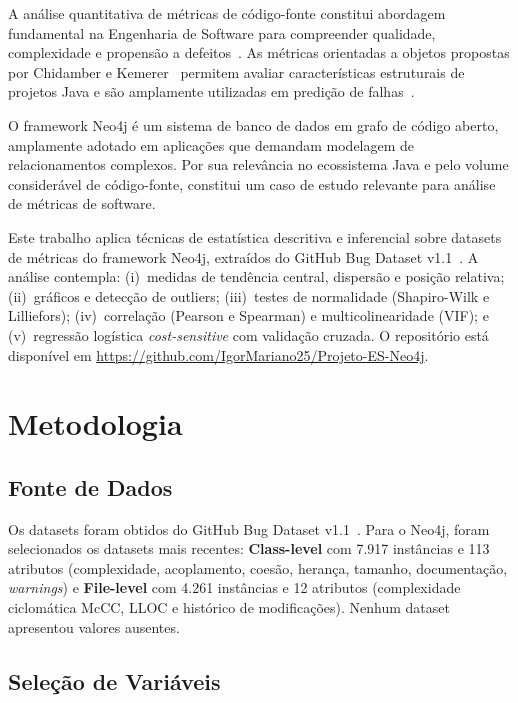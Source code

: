 \documentclass[conference]{IEEEtran}
\begin{document}
A análise quantitativa de métricas de código-fonte constitui abordagem fundamental na Engenharia de Software para compreender qualidade, complexidade e propensão a defeitos~\cite{pressman2014}. As métricas orientadas a objetos propostas por Chidamber e Kemerer~\cite{chidamber1994} permitem avaliar características estruturais de projetos Java e são amplamente utilizadas em predição de falhas~\cite{gyimothy2005,basili1996}.

O framework Neo4j é um sistema de banco de dados em grafo de código aberto, amplamente adotado em aplicações que demandam modelagem de relacionamentos complexos. Por sua relevância no ecossistema Java e pelo volume considerável de código-fonte, constitui um caso de estudo relevante para análise de métricas de software.

Este trabalho aplica técnicas de estatística descritiva e inferencial sobre datasets de métricas do framework Neo4j, extraídos do GitHub Bug Dataset v1.1~\cite{toth2016}. A análise contempla: (i)~medidas de tendência central, dispersão e posição relativa; (ii)~gráficos e detecção de outliers; (iii)~testes de normalidade (Shapiro-Wilk e Lilliefors); (iv)~correlação (Pearson e Spearman) e multicolinearidade (VIF); e (v)~regressão logística \textit{cost-sensitive} com validação cruzada. O repositório está disponível em \url{https://github.com/IgorMariano25/Projeto-ES-Neo4j}.

\section{Metodologia}\label{sec:metodo}

\subsection{Fonte de Dados}

Os datasets foram obtidos do GitHub Bug Dataset v1.1~\cite{toth2016}. Para o Neo4j, foram selecionados os datasets mais recentes: \textbf{Class-level} com 7.917 instâncias e 113 atributos (complexidade, acoplamento, coesão, herança, tamanho, documentação, \textit{warnings}) e \textbf{File-level} com 4.261 instâncias e 12 atributos (complexidade ciclomática McCC, LLOC e histórico de modificações). Nenhum dataset apresentou valores ausentes.

\subsection{Seleção de Variáveis}
\end{document}
